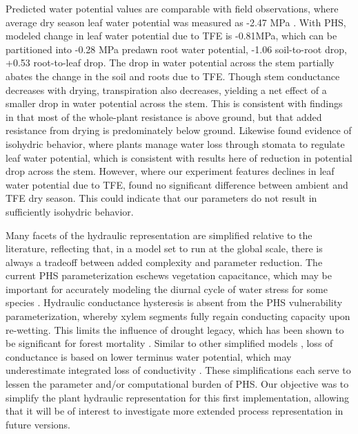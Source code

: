 \documentclass[draft,linenumbers]{agujournal}
\begin{document}
    Predicted water potential values are comparable with field observations, where average dry season leaf water potential was measured as -2.47 MPa \citep{fisher2006}.
    With PHS, modeled change in leaf water potential due to TFE is -0.81MPa, which can be partitioned into -0.28 MPa predawn root water potential, -1.06 soil-to-root drop, +0.53 root-to-leaf drop.
    The drop in water potential across the stem partially abates the change in the soil and roots due to TFE. 
    Though stem conductance decreases with drying, transpiration also decreases, yielding a net effect of a smaller drop in water potential across the stem.
    This is consistent with findings in \cite{fisher2006} that most of the whole-plant resistance is above ground, but that added resistance from drying is predominately below ground.
    Likewise \cite{fisher2006} found evidence of isohydric behavior, where plants manage water loss through stomata to regulate leaf water potential, 
    which is consistent with results here of reduction in potential drop across the stem.
    However, where our experiment features declines in leaf water potential due to TFE, \cite{fisher2006} found no significant difference between ambient and TFE dry season.
    This could indicate that our parameters do not result in sufficiently isohydric behavior.
    
    Many facets of the hydraulic representation are simplified relative to the literature, reflecting that, in a model set to run at the global scale, 
    there is always a tradeoff between added complexity and parameter reduction.
    The current PHS parameterization eschews vegetation capacitance, 
    which may be important for accurately modeling the diurnal cycle of water stress for some species \citep{meinzer2009}.
    Hydraulic conductance hysteresis is absent from the PHS vulnerability parameterization, 
    whereby xylem segments fully regain conducting capacity upon re-wetting.
    This limits the influence of drought legacy, which has been shown to be significant for forest mortality \citep{anderegg2013}.
    Similar to other simplified models \citep{xu2016}, loss of conductance is based on lower terminus water potential, 
    which may underestimate integrated loss of conductivity \citep{sperry2015}.
    These simplifications each serve to lessen the parameter and/or computational burden of PHS.
    Our objective was to simplify the plant hydraulic representation for this first implementation, 
    allowing that it will be of interest to investigate more extended process representation in future versions.
\end{document}

